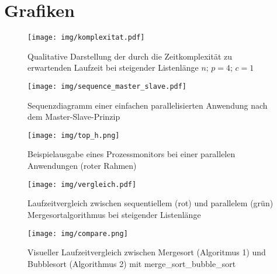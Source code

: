 \chapter*{Grafiken}

\begin{figure}[h]
\begin{center}
\texttt{[image: img/komplexitat.pdf]}
\caption{Qualitative Darstellung der durch die Zeitkomplexität zu erwartenden Laufzeit bei steigender Listenlänge $n$; $p=4$; $c=1$}
\label{komplexitat}
\end{center}
\end{figure}

\begin{figure}[h]
\begin{center}
\texttt{[image: img/sequence\_master\_slave.pdf]}
\caption{Sequenzdiagramm einer einfachen parallelisierten Anwendung nach dem Master-Slave-Prinzip}
\label{sequence_master_slave}
\end{center}
\end{figure}

\begin{figure}[h]
\begin{center}
\texttt{[image: img/top\_h.png]}
\caption{Beispielausgabe eines Prozessmonitors bei einer parallelen Anwendungen (roter Rahmen)}
\label{top_h}
\end{center}
\end{figure}

\begin{figure}[h]
\begin{center}
\texttt{[image: img/vergleich.pdf]}
\caption{Laufzeitvergleich zwischen sequentiellem (rot) und parallelem (grün) Mergesortalgorithmus bei steigender Listenlänge}
\label{laufzeit}
\end{center}
\end{figure}

\begin{figure}[h]
\begin{center}
\texttt{[image: img/compare.png]}
\caption{Visueller Laufzeitvergleich zwischen Mergesort (Algoritmus 1) und Bubblesort (Algorithmus 2) mit merge\_sort\_bubble\_sort}
\label{compare}
\end{center}
\end{figure}